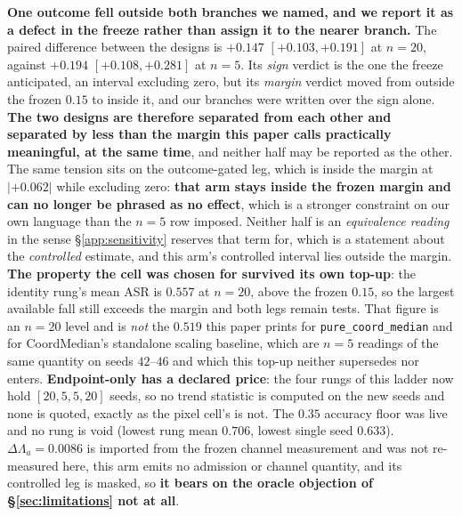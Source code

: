 \documentclass{article}
\begin{document}
\textbf{One outcome fell outside both branches we named, and we report it as a defect in the freeze rather than assign it to the nearer branch.} The paired difference between the designs is $+0.147$ $[+0.103,+0.191]$ at $n{=}20$, against $+0.194$ $[+0.108,+0.281]$ at $n{=}5$. Its \emph{sign} verdict is the one the freeze anticipated, an interval excluding zero, but its \emph{margin} verdict moved from outside the frozen $0.15$ to inside it, and our branches were written over the sign alone. \textbf{The two designs are therefore separated from each other and separated by less than the margin this paper calls practically meaningful, at the same time}, and neither half may be reported as the other. The same tension sits on the outcome-gated leg, which is inside the margin at $|{+}0.062|$ while excluding zero: \textbf{that arm stays inside the frozen margin and can no longer be phrased as no effect}, which is a stronger constraint on our own language than the $n{=}5$ row imposed. Neither half is an \emph{equivalence reading} in the sense §\ref{app:sensitivity} reserves that term for, which is a statement about the \emph{controlled} estimate, and this arm's controlled interval lies outside the margin. \textbf{The property the cell was chosen for survived its own top-up}: the identity rung's mean ASR is $0.557$ at $n{=}20$, above the frozen $0.15$, so the largest available fall still exceeds the margin and both legs remain tests. That figure is an $n{=}20$ level and is \emph{not} the $0.519$ this paper prints for \texttt{pure\_coord\_median} and for CoordMedian's standalone scaling baseline, which are $n{=}5$ readings of the same quantity on seeds $42$--$46$ and which this top-up neither supersedes nor enters. \textbf{Endpoint-only has a declared price}: the four rungs of this ladder now hold $[20,5,5,20]$ seeds, so no trend statistic is computed on the new seeds and none is quoted, exactly as the pixel cell's is not. The $0.35$ accuracy floor was live and no rung is void (lowest rung mean $0.706$, lowest single seed $0.633$). $\Delta\Lambda_a{=}0.0086$ is imported from the frozen channel measurement and was not re-measured here, this arm emits no admission or channel quantity, and its controlled leg is masked, so \textbf{it bears on the oracle objection of §\ref{sec:limitations} not at all}.

\end{document}
